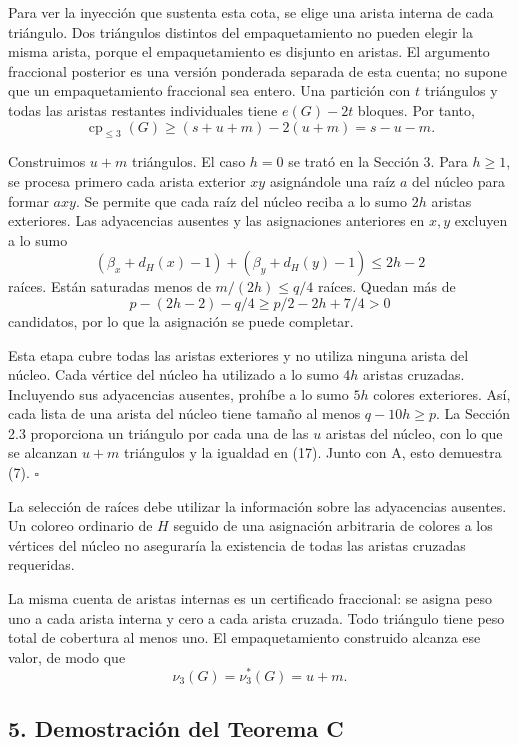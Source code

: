 \documentclass[spanish,11pt,a4paper]{article}
\begin{document}
Para ver la inyección que sustenta esta cota, se elige una arista
interna de cada triángulo. Dos triángulos distintos del empaquetamiento
no pueden elegir la misma arista, porque el empaquetamiento es disjunto
en aristas. El argumento fraccional posterior es una versión ponderada
separada de esta cuenta; no supone que un empaquetamiento fraccional sea
entero. Una partición con \(t\) triángulos y todas las aristas restantes
individuales tiene \(e(G)-2t\) bloques. Por tanto, \[
\operatorname{cp}_{\le3}(G)\ge(s+u+m)-2(u+m)=s-u-m. \tag{17}
\]

Construimos \(u+m\) triángulos. El caso \(h=0\) se trató en la Sección
3. Para \(h\ge1\), se procesa primero cada arista exterior \(xy\)
asignándole una raíz \(a\) del núcleo para formar \(axy\). Se permite
que cada raíz del núcleo reciba a lo sumo \(2h\) aristas exteriores. Las
adyacencias ausentes y las asignaciones anteriores en \(x,y\) excluyen a
lo sumo \[
(\beta_x+d_H(x)-1)+(\beta_y+d_H(y)-1)\le2h-2
\] raíces. Están saturadas menos de \(m/(2h)\le q/4\) raíces. Quedan más
de \[
p-(2h-2)-q/4\ge p/2-2h+7/4>0
\] candidatos, por lo que la asignación se puede completar.

Esta etapa cubre todas las aristas exteriores y no utiliza ninguna
arista del núcleo. Cada vértice del núcleo ha utilizado a lo sumo \(4h\)
aristas cruzadas. Incluyendo sus adyacencias ausentes, prohíbe a lo sumo
\(5h\) colores exteriores. Así, cada lista de una arista del núcleo
tiene tamaño al menos \(q-10h\ge p\). La Sección 2.3 proporciona un
triángulo por cada una de las \(u\) aristas del núcleo, con lo que se
alcanzan \(u+m\) triángulos y la igualdad en (17). Junto con A, esto
demuestra (7). \(\square\)

La selección de raíces debe utilizar la información sobre las
adyacencias ausentes. Un coloreo ordinario de \(H\) seguido de una
asignación arbitraria de colores a los vértices del núcleo no aseguraría
la existencia de todas las aristas cruzadas requeridas.

La misma cuenta de aristas internas es un certificado fraccional: se
asigna peso uno a cada arista interna y cero a cada arista cruzada. Todo
triángulo tiene peso total de cobertura al menos uno. El empaquetamiento
construido alcanza ese valor, de modo que \[
\nu_3(G)=\nu_3^*(G)=u+m. \tag{18}
\]

\subsection{5. Demostración del Teorema
C}\label{demostraciuxf3n-del-teorema-c}
\end{document}
